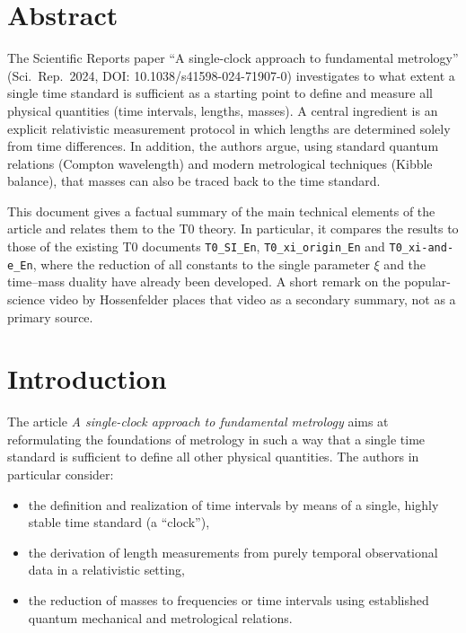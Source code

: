 \section*{Abstract}
The Scientific Reports paper “A single-clock approach to fundamental metrology”
(Sci.\ Rep.\ 2024, DOI: 10.1038/s41598-024-71907-0) investigates to what extent
a single time standard is sufficient as a starting point to define and measure
all physical quantities (time intervals, lengths, masses). A central ingredient
is an explicit relativistic measurement protocol in which lengths are
determined solely from time differences. In addition, the authors argue,
using standard quantum relations (Compton wavelength) and modern metrological
techniques (Kibble balance), that masses can also be traced back to the time
standard.

This document gives a factual summary of the main technical elements
of the article and relates them to the T0 theory. In particular, it compares
the results to those of the existing T0 documents \texttt{T0\_SI\_En},
\texttt{T0\_xi\_origin\_En} and \texttt{T0\_xi-and-e\_En}, where the reduction
of all constants to the single parameter $\xi$ and the time–mass duality have
already been developed. A short remark on the popular-science video by
Hossenfelder places that video as a secondary summary, not as a primary
source.



\section{Introduction}

The article \emph{A single-clock approach to fundamental metrology}
\cite{terrell_single_clock_nature_2024} aims at reformulating the foundations
of metrology in such a way that a single time standard is sufficient to define
all other physical quantities. The authors in particular consider:
\begin{itemize}
  \item the definition and realization of time intervals by means of a single,
        highly stable time standard (a “clock”),
  \item the derivation of length measurements from purely temporal
        observational data in a relativistic setting,
  \item the reduction of masses to frequencies or time intervals using
        established quantum mechanical and metrological relations.
\end{itemize}


